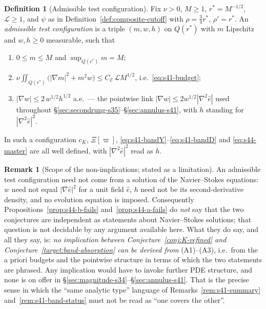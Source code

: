 \documentclass[11pt]{article}
\theoremstyle{definition}
\newtheorem{definition}[theorem]{Definition}
\newtheorem{remark}[theorem]{Remark}
\theoremstyle{remark}
\begin{document}
\begin{definition}[Admissible test configuration]\label{def:s44-config}
  Fix $\nu>0$, $M\geq1$, $r^*=M^{-1/2}$, $\mathcal{L}\geq1$, and $\psi$ as in
  Definition~\ref{def:composite-cutoff} with $\rho=\tfrac34r^*$, $\rho'=r^*$.
  An \emph{admissible test configuration} is a triple $(m,w,h)$ on $Q(r^*)$
  with $m$ Lipschitz and $w,h\geq0$ measurable, such that
  \begin{enumerate}[label=\textup{(A\arabic*)}]
    \item $0\leq m\leq M$ and $\sup_{Q(r^*)}m=M$;
    \item $\nu\iint_{Q(r^*)}\bigl(|\nabla m|^2+m^2w\bigr)
      \leq C_{\mathcal{E}}\,\mathcal{L}M^{1/2}$, i.e.\ \eqref{eq:s41-budget};
    \item $|\nabla w|\leq 2\,w^{1/2}h^{1/2}$ a.e.\ --- the pointwise link
      $|\nabla w|\leq2w^{1/2}|\nabla^2\hat{e}|$ used throughout
      \S\ref{sec:secondrung-s35}--\S\ref{sec:annulus-s41}, with $h$ standing
      for $|\nabla^2\hat{e}|^2$.
  \end{enumerate}
  In such a configuration $c_K$, $\Xi[\varpi]$,
  \eqref{eq:s41-bandY}--\eqref{eq:s41-bandD} and \eqref{eq:s44-master} are all
  well defined, with $|\nabla^2\hat{e}|^2$ read as $h$.
\end{definition}

\begin{remark}[Scope of the non-implications; stated as a limitation]
  \label{rem:s44-scope}
  An admissible test configuration need not come from a solution of the
  Navier--Stokes equations: $w$ need not equal $|\nabla\hat{e}|^2$ for a unit
  field $\hat{e}$, $h$ need not be its second-derivative density, and no
  evolution equation is imposed. Consequently
  Propositions~\ref{prop:s44-b-fails} and~\ref{prop:s44-a-fails} do
  \emph{not} say that the two conjectures are independent as statements about
  Navier--Stokes solutions; that question is not decidable by any argument
  available here. What they do say, and all they say, is: \emph{no implication
  between Conjecture~\ref{conj:K-refined} and
  Conjecture~\ref{target:band-absorption} can be derived from} (A1)--(A3),
  i.e.\ from the a priori budgets and the pointwise structure in terms of
  which the two statements are phrased. Any implication would have to invoke
  further PDE structure, and none is on offer in
  \S\ref{sec:magnitude-s34}--\S\ref{sec:annulus-s41}. That is the precise
  sense in which the ``same analytic type'' language of
  Remarks~\ref{rem:s41-summary} and~\ref{rem:s41-band-status} must not be read
  as ``one covers the other''.
\end{remark}
\end{document}
